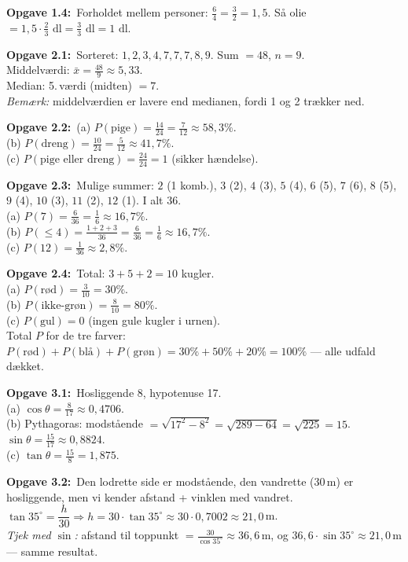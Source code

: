 \documentclass[11pt,a4paper]{article}
\newcommand{\f}[2]{%
  \par\vspace{0.35em}\noindent\textbf{Opgave #1:}\ #2\par
}
\begin{document}
\f{1.4}{Forholdet mellem personer: $\tfrac{6}{4}=\tfrac{3}{2}=1{,}5$. Så olie $=1{,}5\cdot\tfrac{2}{3}\text{ dl}=\tfrac{3}{3}\text{ dl}=1\text{ dl}$.}

\f{2.1}{Sorteret: $1, 2, 3, 4, 7, 7, 7, 8, 9$. Sum $=48$, $n=9$.\\[2pt]
Middelværdi: $\bar x=\tfrac{48}{9}\approx 5{,}33$.\\[2pt]
Median: 5.\,værdi (midten) $=7$.\\[2pt]
\textit{Bemærk:} middelværdien er lavere end medianen, fordi 1 og 2 trækker ned.}

\f{2.2}{(a) $P(\text{pige})=\tfrac{14}{24}=\tfrac{7}{12}\approx 58{,}3\%$.\\[2pt]
(b) $P(\text{dreng})=\tfrac{10}{24}=\tfrac{5}{12}\approx 41{,}7\%$.\\[2pt]
(c) $P(\text{pige eller dreng})=\tfrac{24}{24}=1$ (sikker hændelse).}

\f{2.3}{Mulige summer: $2$ (1 komb.), $3$ (2), $4$ (3), $5$ (4), $6$ (5), $7$ (6), $8$ (5), $9$ (4), $10$ (3), $11$ (2), $12$ (1). I alt 36.\\[2pt]
(a) $P(7)=\tfrac{6}{36}=\tfrac{1}{6}\approx 16{,}7\%$.\\[2pt]
(b) $P(\leq 4)=\tfrac{1+2+3}{36}=\tfrac{6}{36}=\tfrac{1}{6}\approx 16{,}7\%$.\\[2pt]
(c) $P(12)=\tfrac{1}{36}\approx 2{,}8\%$.}

\f{2.4}{Total: $3+5+2=10$ kugler.\\[2pt]
(a) $P(\text{rød})=\tfrac{3}{10}=30\%$.\\[2pt]
(b) $P(\text{ikke-grøn})=\tfrac{8}{10}=80\%$.\\[2pt]
(c) $P(\text{gul})=0$ (ingen gule kugler i urnen).\\[2pt]
Total $P$ for de tre farver: $P(\text{rød})+P(\text{blå})+P(\text{grøn})=30\%+50\%+20\%=100\%$ — alle udfald dækket.}

\f{3.1}{Hosliggende 8, hypotenuse 17.\\[2pt]
(a) $\cos\theta=\tfrac{8}{17}\approx 0{,}4706$.\\[2pt]
(b) Pythagoras: modstående $=\sqrt{17^2-8^2}=\sqrt{289-64}=\sqrt{225}=15$. $\sin\theta=\tfrac{15}{17}\approx 0{,}8824$.\\[2pt]
(c) $\tan\theta=\tfrac{15}{8}=1{,}875$.}

\f{3.2}{Den lodrette side er modstående, den vandrette (30\,m) er hosliggende, men vi kender afstand + vinklen med vandret.\\[2pt]
$\tan 35^\circ=\dfrac{h}{30}\Rightarrow h=30\cdot\tan 35^\circ\approx 30\cdot 0{,}7002\approx 21{,}0$\,m.\\[2pt]
\textit{Tjek med $\sin$:} afstand til toppunkt $=\tfrac{30}{\cos 35^\circ}\approx 36{,}6$\,m, og $36{,}6\cdot\sin 35^\circ\approx 21{,}0$\,m — samme resultat.}
\end{document}
